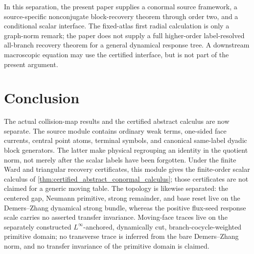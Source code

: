 \documentclass[11pt]{amsart}
\theoremstyle{compactplain}
\theoremstyle{compactdefinition}
\theoremstyle{compactremark}
\begin{document}
In this separation, the present paper supplies a conormal source framework, a
source-specific nonconjugate block-recovery theorem through order two, and a
conditional scalar interface.  The fixed-atlas first radial calculation is
only a graph-norm remark; the paper does not supply a full
higher-order label-resolved all-branch
recovery theorem for a general dynamical response tree.  A downstream
macroscopic equation may use the certified interface, but
is not part of the present argument.

\section{Conclusion}

The actual collision-map results and the certified abstract calculus are now
separate.  The source module contains ordinary weak terms, one-sided face
currents, central point atoms, terminal symbols, and canonical same-label
dyadic block generators.  The latter make physical regrouping an identity in
the quotient norm, not merely after the scalar labels have been forgotten.
Under the finite Ward and triangular recovery certificates, this module gives
the finite-order scalar calculus of
\cref{thm:certified_abstract_conormal_calculus}; those certificates are not
claimed for a generic moving table.
The topology is likewise separated: the centered gap, Neumann primitive,
strong remainder, and base reset live on the Demers--Zhang dynamical strong
bundle, whereas the positive flux-seed response scale carries no asserted
transfer invariance.  Moving-face traces live on the separately constructed
\(L^\infty\)-anchored, dynamically cut, branch-cocycle-weighted primitive
domain; no transverse trace is inferred from the bare Demers--Zhang norm, and
no transfer invariance of the primitive domain is claimed.
\end{document}
